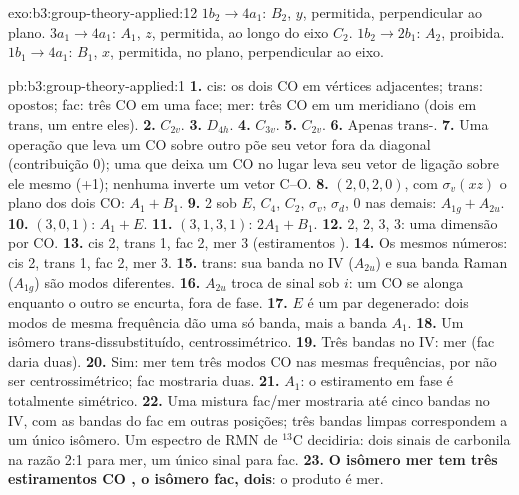\begin{solution}{exo:b3:group-theory-applied:12}
$1b_2 \to 4a_1$: $B_2$, $y$, permitida, perpendicular ao plano. $3a_1 \to 4a_1$:
$A_1$, $z$, permitida, ao longo do eixo $C_2$. $1b_2 \to 2b_1$: $A_2$, proibida.
$1b_1 \to 4a_1$: $B_1$, $x$, permitida, no plano, perpendicular ao eixo.
\end{solution}

\begin{solution}{pb:b3:group-theory-applied:1}
\textbf{1.} cis: os dois CO em vértices adjacentes; trans: opostos; fac: três
CO em uma face; mer: três CO em um meridiano (dois em trans, um entre eles).
\textbf{2.} $C_{2v}$.
\textbf{3.} $D_{4h}$.
\textbf{4.} $C_{3v}$.
\textbf{5.} $C_{2v}$.
\textbf{6.} Apenas trans-.
\textbf{7.} Uma operação que leva um CO sobre outro põe seu vetor fora da
diagonal (contribuição 0); uma que deixa um CO no lugar leva seu vetor de
ligação sobre ele mesmo (+1); nenhuma inverte um vetor C--O.
\textbf{8.}  $(2, 0, 2, 0)$, com $\sigma_v(xz)$ o plano dos dois CO: $A_1 +
B_1$.
\textbf{9.}  2 sob $E$, $C_4$, $C_2$, $\sigma_v$, $\sigma_d$, 0 nas demais:
$A_{1g} + A_{2u}$.
\textbf{10.} $(3, 0, 1)$: $A_1 + E$.
\textbf{11.} $(3, 1, 3, 1)$: $2A_1 + B_1$.
\textbf{12.} 2, 2, 3, 3: uma dimensão por CO.
\textbf{13.} cis 2, trans 1, fac 2, mer 3 (estiramentos ).
\textbf{14.} Os mesmos números: cis 2, trans 1, fac 2, mer 3.
\textbf{15.} trans: sua banda no IV ($A_{2u}$) e sua banda Raman ($A_{1g}$) são
modos diferentes.
\textbf{16.} $A_{2u}$ troca de sinal sob $i$: um CO se alonga enquanto o outro
se encurta, fora de fase.
\textbf{17.} $E$ é um par degenerado: dois modos de mesma frequência dão uma
só banda, mais a banda $A_1$.
\textbf{18.} Um isômero trans-dissubstituído, centrossimétrico.
\textbf{19.} Três bandas no IV: mer (fac daria duas).
\textbf{20.} Sim: mer tem três modos CO  nas mesmas frequências,
por não ser centrossimétrico; fac mostraria duas.
\textbf{21.} $A_1$: o estiramento em fase é totalmente simétrico.
\textbf{22.} Uma mistura fac/mer mostraria até cinco bandas no IV, com as bandas
do fac em outras posições; três bandas limpas correspondem a um único isômero.
Um espectro de RMN de ${}^{13}$C decidiria: dois sinais de carbonila na razão 2:1
para mer, um único sinal para fac.
\textbf{23.} \textbf{O isômero mer tem três estiramentos CO , o isômero
fac, dois}: o produto é mer.
\end{solution}
